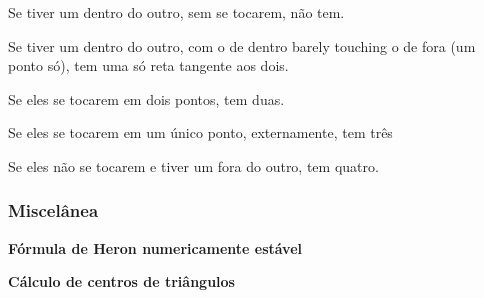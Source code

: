Se tiver um dentro do outro, sem se tocarem, não tem.

Se tiver um dentro do outro, com o de dentro barely touching o de fora (um ponto só), tem uma só reta tangente aos dois.

Se eles se tocarem em dois pontos, tem duas.

Se eles se tocarem em um único ponto, externamente, tem três

Se eles não se tocarem e tiver um fora do outro, tem quatro.



\subsubsection{Miscelânea}

\textbf{Fórmula de Heron numericamente estável}


\textbf{Cálculo de centros de triângulos}

